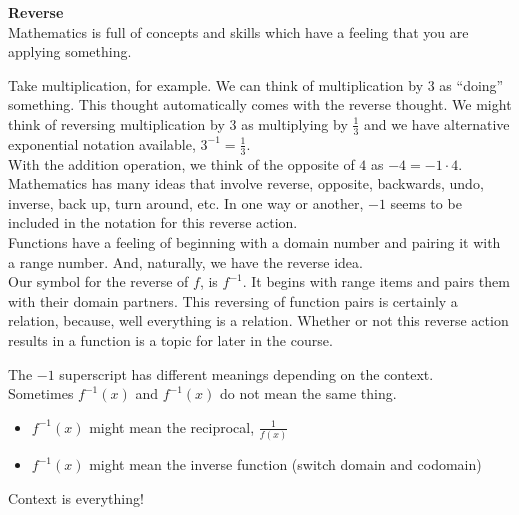 \documentclass{ximera}
\begin{document}
\begin{notation} \textbf{\textcolor{purple!85!blue}{Reverse}}  \\

Mathematics is full of concepts and skills which have a feeling that you are applying something.

Take multiplication, for example.  We can think of multiplication by $3$ as ``doing'' something.  This thought automatically comes with the reverse thought.  We might think of reversing multiplication by $3$ as multiplying by $\frac{1}{3}$ and we have alternative exponential notation available, $3^{-1} = \frac{1}{3}$. \\


With the addition operation, we think of the opposite of $4$ as $-4 = -1 \cdot 4$. \\


Mathematics has many ideas that involve reverse, opposite, backwards, undo, inverse, back up, turn around, etc. In one way or another, $-1$ seems to be included in the notation for this reverse action.  \\


Functions have a feeling of beginning with a domain number and pairing it with a range number.  And, naturally, we have the reverse idea. \\

Our symbol for the reverse of $f$, is $f^{-1}$.  It begins with range items and pairs them with their domain partners.  This reversing of function pairs is certainly a relation, because, well everything is a relation.  Whether or not this reverse action results in a function is a topic for later in the course.



\end{notation}



\begin{warning}


The $-1$ superscript has different meanings depending on the context. \\


Sometimes $f^{-1}(x)$ and $f^{-1}(x)$ do not mean the same thing.\\


\begin{itemize}
\item $f^{-1}(x)$ might mean the reciprocal, $\frac{1}{f(x)}$
\item $f^{-1}(x)$ might mean the inverse function (switch domain and codomain)
\end{itemize}


Context is everything! \\

\end{warning}
\end{document}
